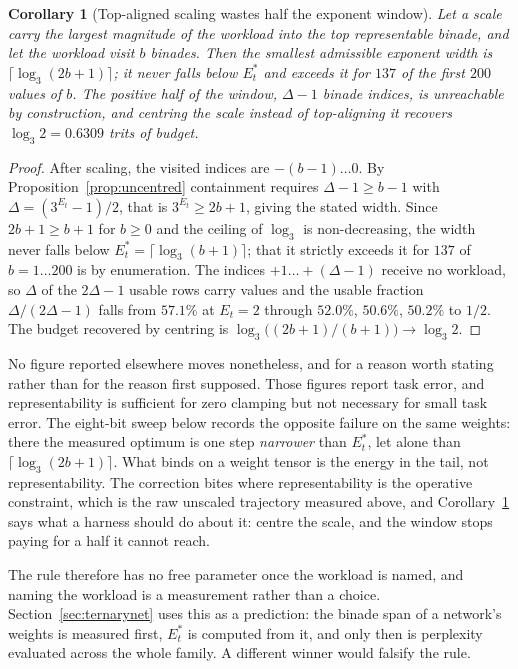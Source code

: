 \documentclass[11pt]{article}
\newtheorem{corollary}{Corollary}
\theoremstyle{definition}
\begin{document}
\begin{corollary}[Top-aligned scaling wastes half the exponent window]
\label{cor:topaligned}
Let a scale carry the largest magnitude of the workload into the top representable
binade, and let the workload visit $b$ binades. Then the smallest admissible
exponent width is $\lceil \log_3(2b+1) \rceil$; it never falls below $E_t^{*}$ and
exceeds it for $137$ of the first $200$ values of $b$. The positive half of the
window, $\Delta-1$ binade indices, is unreachable by construction, and centring
the scale instead of top-aligning it recovers $\log_3 2 = 0.6309$ trits of budget.
\end{corollary}

\begin{proof}
After scaling, the visited indices are $-(b-1) \ldots 0$. By
Proposition~\ref{prop:uncentred} containment requires $\Delta - 1 \ge b-1$ with
$\Delta = (3^{E_t}-1)/2$, that is $3^{E_t} \ge 2b+1$, giving the stated width.
Since $2b+1 \ge b+1$ for $b \ge 0$ and the ceiling of $\log_3$ is non-decreasing,
the width never falls below $E_t^{*} = \lceil\log_3(b+1)\rceil$; that it strictly
exceeds it for $137$ of $b = 1 \ldots 200$ is by enumeration. The indices
$+1 \ldots +(\Delta-1)$ receive no workload, so $\Delta$ of the $2\Delta-1$ usable
rows carry values and the usable fraction $\Delta/(2\Delta-1)$ falls from
$57.1\%$ at $E_t=2$ through $52.0\%$, $50.6\%$, $50.2\%$ to $1/2$. The budget
recovered by centring is $\log_3\bigl((2b+1)/(b+1)\bigr) \to \log_3 2$.
\end{proof}

No figure reported elsewhere moves nonetheless, and for a reason worth stating
rather than for the reason first supposed. Those figures report task error, and
representability is sufficient for zero clamping but not necessary for small task
error. The eight-bit sweep below records the opposite failure on the same weights:
there the measured optimum is one step \emph{narrower} than $E_t^{*}$, let alone
than $\lceil\log_3(2b+1)\rceil$. What binds on a weight tensor is the energy in the
tail, not representability. The correction bites where representability is the
operative constraint, which is the raw unscaled trajectory measured above, and
Corollary~\ref{cor:topaligned} says what a harness should do about it: centre the
scale, and the window stops paying for a half it cannot reach.

The rule therefore has no free parameter once the workload is named, and naming
the workload is a measurement rather than a choice. Section~\ref{sec:ternarynet}
uses this as a prediction: the binade span of a network's weights is measured
first, $E_t^{*}$ is computed from it, and only then is perplexity evaluated across
the whole family. A different winner would falsify the rule.
\end{document}
